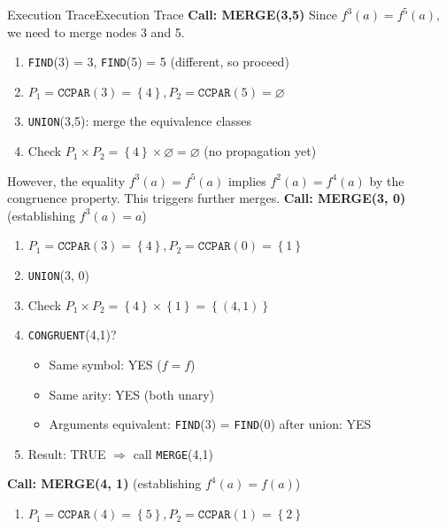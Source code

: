 \documentclass[a4paper]{article}
\theoremstyle{definition}
\begin{document}
\begin{theorem}{Execution Trace}{Execution Trace}
\textbf{Call: MERGE(3,5)}
\vspace{1em}
\noindent
\newline
Since \( f^3(a) = f^5(a) \), we need to merge nodes 3 and 5. 
\begin{enumerate}
	\item \texttt{FIND}(3) = 3, \texttt{FIND}(5) = 5 (different, so proceed)
	\item \( P_1 = \texttt{CCPAR}(3) = \left\{4\right\}, P_2 = \texttt{CCPAR}(5) = \varnothing \)   
	\item \texttt{UNION}(3,5): merge the equivalence classes 
	\item Check \( P_1 \times P_2 = \left\{4\right\} \times \varnothing = \varnothing \) (no propagation yet)
\end{enumerate}
However, the equality \( f^3(a) = f^5(a) \) implies \( f^2(a) = f^4(a) \) by the congruence property.
\vspace{1em}
\noindent
\newline
This triggers further merges.
\vspace{1em}
\noindent
\newline
\textbf{Call: MERGE(3, 0)} (establishing \( f^3(a) = a \))
\begin{enumerate}
	\item \( P_1 = \texttt{CCPAR}(3) = \left\{4\right\}, P_2 = \texttt{CCPAR}(0) = \left\{1\right\} \)    
	\item \texttt{UNION}(3, 0)
	\item Check \( P_1 \times P_2 = \left\{4\right\} \times \left\{1\right\} = \left\{(4,1)\right\} \)   
	\item \texttt{CONGRUENT}(4,1)?
	\begin{itemize}
		\item Same symbol: YES (\( f = f \))
		\item Same arity: YES (both unary)
		\item Arguments equivalent: \texttt{FIND}(3) = \texttt{FIND}(0) after union: YES
	\end{itemize}
	\item Result: TRUE \( \Rightarrow \) call \texttt{MERGE}(4,1)
\end{enumerate}
\vspace{1em}
\noindent
\newline
\textbf{Call: MERGE(4, 1)} (establishing \( f^4(a) = f(a) \))
\begin{enumerate}
	\item \( P_1 = \texttt{CCPAR}(4) = \left\{5\right\}, P_2 = \texttt{CCPAR}(1) = \left\{2\right\} \)    

\end{enumerate}
\end{theorem}
\end{document}
